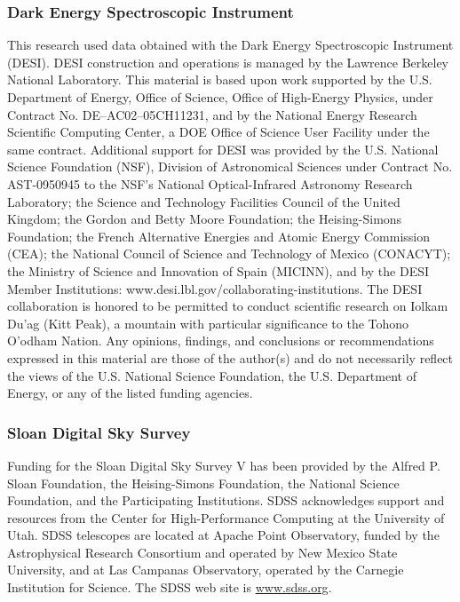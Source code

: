 \documentclass[]{polymathic}
\begin{document}
\subsubsection{Dark Energy Spectroscopic Instrument}
This research used data obtained with the Dark Energy Spectroscopic Instrument (DESI).
DESI construction and operations is managed by the Lawrence Berkeley National Laboratory.
This material is based upon work supported by the U.S. Department of Energy, Office of
Science, Office of High-Energy Physics, under Contract No. DE–AC02–05CH11231, and
by the National Energy Research Scientific Computing Center, a DOE Office of Science
User Facility under the same contract. Additional support for DESI was provided by the
U.S. National Science Foundation (NSF), Division of Astronomical Sciences under Contract
No. AST-0950945 to the NSF’s National Optical-Infrared Astronomy Research Laboratory;
the Science and Technology Facilities Council of the United Kingdom; the Gordon and
Betty Moore Foundation; the Heising-Simons Foundation; the French Alternative Energies
and Atomic Energy Commission (CEA); the National Council of Science and Technology
of Mexico (CONACYT); the Ministry of Science and Innovation of Spain (MICINN), and
by the DESI Member Institutions: www.desi.lbl.gov/collaborating-institutions. The DESI
collaboration is honored to be permitted to conduct scientific research on Iolkam Du’ag (Kitt
Peak), a mountain with particular significance to the Tohono O’odham Nation. Any opinions,
findings, and conclusions or recommendations expressed in this material are those of the
author(s) and do not necessarily reflect the views of the U.S. National Science Foundation,
the U.S. Department of Energy, or any of the listed funding agencies.

\subsubsection{Sloan Digital Sky Survey}
Funding for the Sloan Digital Sky Survey V has been provided by the Alfred P. Sloan Foundation, the Heising-Simons Foundation, the National Science Foundation, and the Participating Institutions. SDSS acknowledges support and resources from the Center for High-Performance Computing at the University of Utah. SDSS telescopes are located at Apache Point Observatory, funded by the Astrophysical Research Consortium and operated by New Mexico State University, and at Las Campanas Observatory, operated by the Carnegie Institution for Science. The SDSS web site is \url{www.sdss.org}.
\end{document}
